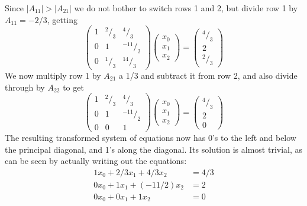 Since $|A_{11}| > |A_{21}|$ we do not bother to switch rows 1 and 2, but
divide row 1 by $A_{11} =-2/3$, getting
\begin{equation}
    \label{eq:09_19}
    \begin{pmatrix}
        1 & ^2/_3 & ^4/_3\\ 
        0 & 1 & ^{-11}/_2\\ 
        0 & ^1/_3 & ^{14}/_3
    \end{pmatrix}
    \begin{pmatrix}
        x_0\\
        x_1\\
        x_2
    \end{pmatrix}
    =
    \begin{pmatrix}
        ^4/_3\\
        2\\
        ^2/_3
    \end{pmatrix}
\end{equation}
We now multiply row 1 by $A_{21}$ a 1/3 and subtract it from row 2,
and also divide through by $A_{22}$ to get
\begin{equation}
    \label{eq:09_20}
    \begin{pmatrix}
        1 & ^2/_3 & ^4/_3\\ 
        0 & 1 & ^{-11}/_2\\ 
        0 & 0 & 1
    \end{pmatrix}
    \begin{pmatrix}
        x_0\\
        x_1\\
        x_2
    \end{pmatrix}
    =
    \begin{pmatrix}
        ^4/_3\\
        2\\
        0
    \end{pmatrix}
\end{equation}
The resulting transformed system of equations now has 0's to the
left and below the principal diagonal, and 1's along the diagonal.
Its solution is almost trivial, as can be seen by actually writing out
the equations:
\begin{subequations}
    \begin{align}
         \label{eq:09_21_0}
        1 x_0 + 2/3 x_1 + 4/3 x_2 &= 4/3\\
         \label{eq:09_21_1}
        0 x_0 + 1 x_1 + (-11/2) x_2 &= 2 \\
        0 x_0 + 0 x_1 + 1 x_2 &= 0 \label{eq:09_21_2}
    \end{align} 
\end{subequations}
